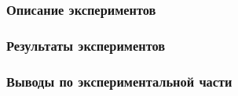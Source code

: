 \subsubsection{Описание экспериментов}

\subsubsection{Результаты экспериментов}

\subsubsection{Выводы по экспериментальной части}

